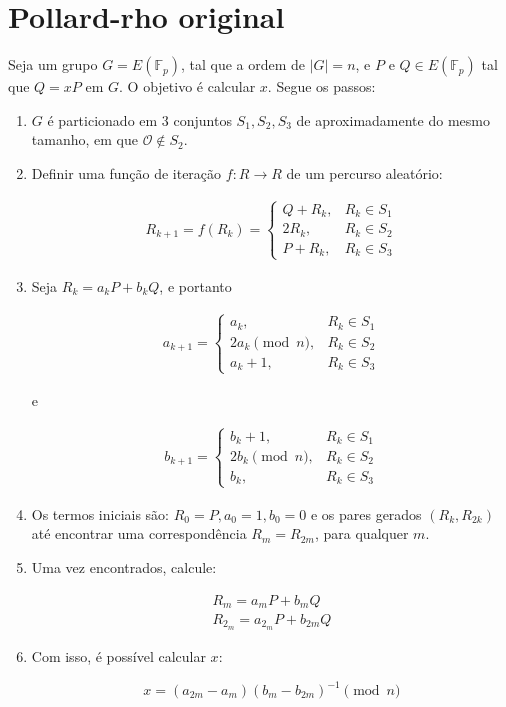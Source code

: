 \section{Pollard-rho original}
Seja um grupo $G = E(\mathbb{F}_p)$, tal que a ordem de $|G| = n$, e \(P\) e \(Q \in E(\mathbb{F}_p)\) tal que $Q = xP$ em \(G\). O objetivo é calcular \(x\). Segue os passos:

\begin{enumerate}
\item \(G\) é particionado em 3 conjuntos $S_1, S_2, S_3$ de aproximadamente do mesmo tamanho, em que $\mathcal{O} \notin S_2$.
\item Definir uma função de iteração $f : R \to R$ de um percurso aleatório:

\begin{eqnarray} \label{eq:walk}
R_{k+1} = f(R_k) =
\begin{cases}
Q + R_k, &R_k \in S_1 \\
2R_k, &R_k \in S_2 \\
P + R_k, &R_k \in S_3
\end{cases}
\end{eqnarray}

\item Seja $R_k = a_kP + b_kQ$, e portanto

\begin{eqnarray}
a_{k+1} =
\begin{cases}
a_k, &R_k \in S_1 \\
2a_k \pmod n, &R_k \in S_2 \\
a_k + 1, &R_k \in S_3
\end{cases}
\end{eqnarray}

e

\begin{eqnarray}
b_{k+1} =
\begin{cases}
b_k + 1, &R_k \in S_1 \\
2b_k \pmod n, &R_k \in S_2 \\
b_k, &R_k \in S_3
\end{cases}
\end{eqnarray}

\item Os termos iniciais são: $R_0 = P, a_0 = 1, b_0 = 0$ e os pares gerados $(R_k, R_{2k})$ até encontrar uma correspondência $R_m = R_{2m}$, para qualquer \(m\).

\item Uma vez encontrados, calcule:

\begin{eqnarray*}
R_m = a_mP + b_mQ \\
R_{2_m} = a_{2_m}P + b_{2m}Q
\end{eqnarray*}

\item Com isso, é possível calcular \(x\):

\begin{equation} \label{eq:x}
x = (a_{2m} - a_m)(b_m - b_{2m})^{-1} \pmod n
\end{equation}

\end{enumerate}

